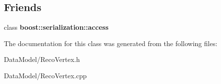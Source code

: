 \subsection*{Friends}
\begin{DoxyCompactItemize}
\item 
\hypertarget{classRecoVertex_ac98d07dd8f7b70e16ccb9a01abf56b9c}{
class {\bfseries boost::serialization::access}}
\label{classRecoVertex_ac98d07dd8f7b70e16ccb9a01abf56b9c}

\end{DoxyCompactItemize}


The documentation for this class was generated from the following files:\begin{DoxyCompactItemize}
\item 
DataModel/RecoVertex.h\item 
DataModel/RecoVertex.cpp\end{DoxyCompactItemize}
